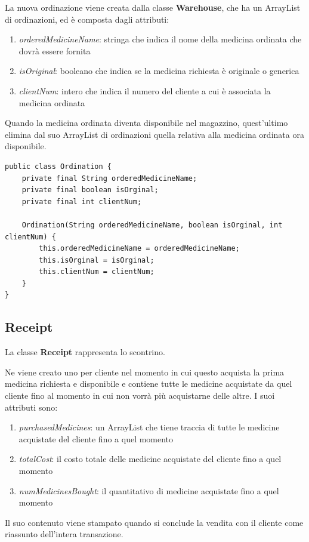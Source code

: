 \documentclass[a4paper, 10pt]{report}
\begin{document}
La nuova ordinazione viene creata dalla classe \textbf{Warehouse}, che ha un ArrayList di ordinazioni, ed è composta dagli attributi:
\begin{enumerate}
\item \textit{orderedMedicineName}: stringa che indica il nome della medicina ordinata che dovrà essere fornita
\item \textit{isOriginal}: booleano che indica se la medicina richiesta è originale o generica
\item \textit{clientNum}: intero che indica il numero del cliente a cui è associata la medicina ordinata
\end{enumerate}
Quando la medicina ordinata diventa disponibile nel magazzino, quest'ultimo elimina dal suo ArrayList di ordinazioni quella relativa alla medicina ordinata ora disponibile.\\
\begin{lstlisting}
public class Ordination {
    private final String orderedMedicineName;
    private final boolean isOrginal;
    private final int clientNum;

    Ordination(String orderedMedicineName, boolean isOrginal, int clientNum) {
        this.orderedMedicineName = orderedMedicineName;
        this.isOrginal = isOrginal;
        this.clientNum = clientNum;
    }
}
\end{lstlisting}
\subsection{Receipt}
La classe \textbf{Receipt} rappresenta lo scontrino. 

Ne viene creato uno per cliente nel momento in cui questo acquista la prima medicina richiesta e disponibile e contiene tutte le medicine acquistate da quel cliente fino al momento in cui non vorrà più acquistarne delle altre. I suoi attributi sono:
\begin{enumerate}
\item \textit{purchasedMedicines}: un ArrayList che tiene traccia di tutte le medicine acquistate del cliente fino a quel momento
\item \textit{totalCost}: il costo totale delle medicine acquistate del cliente fino a quel momento
\item \textit{numMedicinesBought}: il quantitativo di medicine acquistate fino a quel momento
\end{enumerate}
Il suo contenuto viene stampato quando si conclude la vendita con il cliente come riassunto dell'intera transazione.
\end{document}
